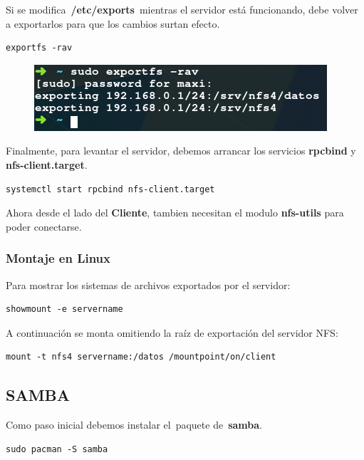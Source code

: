 \documentclass[12pt]{extarticle}
\begin{document}
Si se modifica~\textbf{/etc/exports}~mientras el servidor está
funcionando, debe volver a exportarlos para que los cambios surtan
efecto.

\begin{verbatim}
exportfs -rav
\end{verbatim}

\begin{figure}[h]
\centering
\includegraphics{images/exportfs.png}
\caption{}
\end{figure}

Finalmente, para levantar el servidor, debemos arrancar los servicios
\textbf{rpcbind} y \textbf{nfs-client.target}.

\begin{verbatim}
systemctl start rpcbind nfs-client.target
\end{verbatim}

Ahora desde el lado del \textbf{Cliente}, tambien necesitan el modulo
\textbf{nfs-utils} para poder conectarse.

\subsubsection{Montaje en Linux}\label{montaje-en-linux}

Para mostrar los sistemas de archivos exportados por el servidor:

\begin{verbatim}
showmount -e servername
\end{verbatim}

A continuación se monta omitiendo la raíz de exportación del servidor
NFS:

\begin{verbatim}
mount -t nfs4 servername:/datos /mountpoint/on/client
\end{verbatim}

\subsection{SAMBA}\label{samba}

Como paso inicial debemos instalar el~paquete de~\textbf{samba}.

\begin{verbatim}
sudo pacman -S samba
\end{verbatim}
\end{document}
